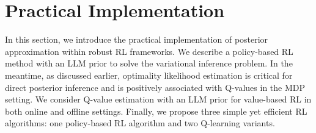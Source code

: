 \documentclass{article} %
\theoremstyle{plain}
\theoremstyle{definition}
\theoremstyle{remark}
\begin{document}
{%

\fi

\section{Practical Implementation}\label{sec: implementation}
In this section, we introduce the practical implementation of posterior approximation within robust RL frameworks. We describe a policy-based RL method with an LLM prior to solve the variational inference problem. In the meantime, as discussed earlier, optimality likelihood estimation is critical for direct posterior inference and is positively associated with Q-values in the MDP setting. We consider Q-value estimation with an LLM prior for value-based RL in both online and offline settings. Finally, we propose three simple yet efficient RL algorithms: one policy-based RL algorithm and two Q-learning variants.

}
\end{document}
